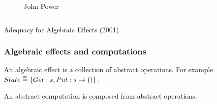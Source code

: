 \begin{frame}
\begin{columns}
\begin{column}{0.5\textwidth}
\begin{center}
\begin{figure}
          \caption{John Power}
        \end{figure}
      \end{center}
    \end{column}
  \end{columns}
  \begin{center}
    Adequacy for Algebraic Effects (2001)
  \end{center}
\end{frame}

\begin{frame}
  \frametitle{Algebraic effects and computations}
  \begin{definition}
    An algebraic effect is a collection of abstract operations. 
    For example $State \defas \{ Get : s, Put : s \to () \}$.
  \end{definition}
  \begin{definition}
    An abstract computation is composed from abstract operations.
  \end{definition}

\end{frame}

